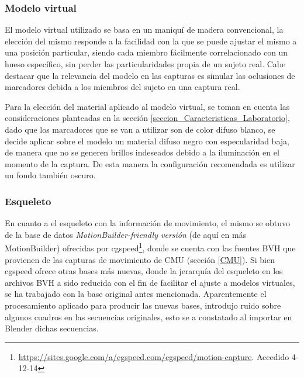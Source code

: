 \subsubsection*{Modelo virtual}  
El modelo virtual utilizado se basa en un maniquí de madera convencional, la elección del mismo responde a la facilidad con la que se puede ajustar el mismo a una posición particular, siendo cada miembro fácilmente correlacionado con un hueso específico, sin perder las particularidades propia de un sujeto real. Cabe destacar que la relevancia del modelo en las capturas es simular las oclusiones de marcadores debida a los miembros del sujeto en una captura real.  

Para la elección del material aplicado al modelo virtual, se toman en cuenta las consideraciones planteadas en la sección \ref{seccion_Caracteristicas_Laboratorio}, dado que los marcadores que se van a utilizar son de color difuso blanco, se decide aplicar sobre el modelo un material difuso negro con especularidad baja, de manera que no se generen brillos indeseados debido a la iluminación en el momento de la captura. De esta manera la configuración recomendada es utilizar un fondo también oscuro.

\subsubsection*{Esqueleto}
En cuanto a el esqueleto con la información de movimiento, el mismo se obtuvo de la base de datos \textit{MotionBuilder-friendly versión} (de aquí en más MotionBuilder) ofrecidas por cgspeed\footnote{\textcolor{blue}{\underline{\url{https://sites.google.com/a/cgspeed.com/cgspeed/motion-capture}}}. Accedido 4-12-14},
 donde se cuenta con las fuentes BVH que provienen de las capturas de movimiento de CMU (sección \ref{CMU}). Si bien cgspeed ofrece otras bases más nuevas, donde la jerarquía del esqueleto en los archivos BVH a sido reducida con el fin de facilitar el ajuste a modelos virtuales, se ha trabajado con la base original antes mencionada. Aparentemente el procesamiento aplicado para producir las nuevas bases, introdujo ruido sobre algunos cuadros en las secuencias originales, esto se a constatado al importar en Blender dichas secuencias.
      
